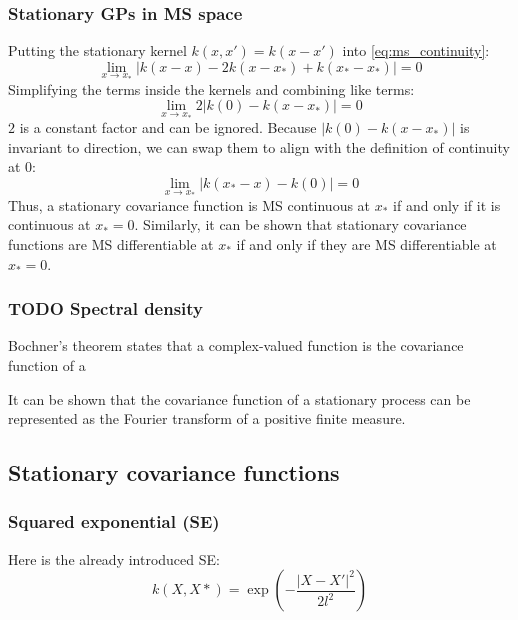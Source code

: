 
\subsubsection{Stationary GPs in MS space}
Putting the stationary kernel $k(x,x') = k(x - x')$ into \ref{eq:ms_continuity}:
\begin{equation*}
    \lim_{x \to x_*} | k(x - x) - 2k(x - x_*) + k(x_* - x_*) | = 0
\end{equation*}
Simplifying the terms inside the kernels and combining like terms:
\begin{equation*}
    \lim_{x \to x_*} 2 | k(0) - k(x - x_*) | = 0
\end{equation*}
$2$ is a constant factor and can be ignored. Because $ | k(0) - k(x - x_*) |$ is invariant to direction, we can swap them to align with the definition of continuity at 0:
\begin{equation*}
    \lim_{x \to x_*} | k(x_* - x) - k(0) | = 0
\end{equation*}
Thus, a stationary covariance function is MS continuous at $x_*$ if and only if it is continuous at $x_* = 0$. Similarly, it can be shown that stationary covariance functions are MS differentiable at $x_*$ if and only if they are MS differentiable at $x_* = 0$.

\subsubsection{TODO Spectral density}
Bochner's theorem states that a complex-valued function is the covariance function of a 

It can be shown \cite{Gikhman2004-wc} that the covariance function of a stationary process can be represented as the Fourier transform of a positive finite measure.

\subsection{Stationary covariance functions \cite{gp-ml}}

\subsubsection{Squared exponential (SE)}
Here is the already introduced SE:
\begin{equation*}
    k(X,X*) = \exp \left(- \frac{|X - X'|^2}{2l^2} \right)
\end{equation*}

